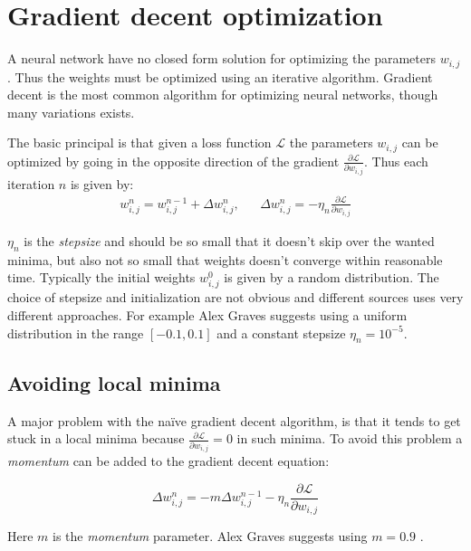 
\section{Gradient decent optimization}

A neural network have no closed form solution for optimizing the parameters $w_{i,j}$. Thus the weights must be optimized using an iterative algorithm. Gradient decent is the most common algorithm for optimizing neural networks, though many variations exists.

The basic principal is that given a loss function $\mathcal{L}$ the parameters $w_{i,j}$ can be optimized by going in the opposite direction of the gradient $\frac{\partial \mathcal{L}}{\partial w_{i,j}}$. Thus each iteration $n$ is given by:
\begin{equation}
\begin{aligned}
w_{i,j}^n = w_{i,j}^{n-1} + \Delta w_{i,j}^n, && \Delta w_{i,j}^n = - \eta_n \frac{\partial \mathcal{L}}{\partial w_{i,j}}
\end{aligned}
\end{equation}

$\eta_n$ is the \textit{stepsize} and should be so small that it doesn't skip over the wanted minima, but also not so small that weights doesn't converge within reasonable time. Typically the initial weights $w^0_{i,j}$ is given by a random distribution. The choice of stepsize and initialization are not obvious and different sources uses very different approaches. For example Alex Graves \cite{alexgraves} suggests using a uniform distribution in the range $[-0.1, 0.1]$ and a constant stepsize $\eta_n = 10^{-5}$.

\subsection{Avoiding local minima}

A major problem with the naïve gradient decent algorithm, is that it tends to get stuck in a local minima because $\frac{\partial \mathcal{L}}{\partial w_{i,j}} = 0$ in such minima. To avoid this problem a \textit{momentum} can be added to the gradient decent equation:

\begin{equation}
\Delta w_{i,j}^n = - m \Delta w_{i,j}^{n-1} - \eta_n \frac{\partial \mathcal{L}}{\partial w_{i,j}}
\end{equation}

Here $m$ is the \textit{momentum} parameter. Alex Graves suggests using $m = 0.9$ \cite{alexgraves}.

